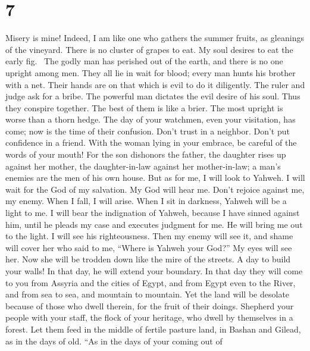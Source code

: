 \hypertarget{section-5}{%
\section{7}\label{section-5}}

 Misery is mine! Indeed, I am like one who gathers the
summer fruits, as gleanings of the vineyard. There is no cluster of
grapes to eat. My soul desires to eat the early fig.~ The
godly man has perished out of the earth, and there is no one upright
among men. They all lie in wait for blood; every man hunts his brother
with a net.  Their hands are on that which is evil to do
it diligently. The ruler and judge ask for a bribe. The powerful man
dictates the evil desire of his soul. Thus they conspire together.
 The best of them is like a brier. The most upright is
worse than a thorn hedge. The day of your watchmen, even your
visitation, has come; now is the time of their confusion. 
Don't trust in a neighbor. Don't put confidence in a friend. With the
woman lying in your embrace, be careful of the words of your mouth!
 For the son dishonors the father, the daughter rises up
against her mother, the daughter-in-law against her mother-in-law; a
man's enemies are the men of his own house.  But as for
me, I will look to Yahweh. I will wait for the God of my salvation. My
God will hear me.  Don't rejoice against me, my enemy.
When I fall, I will arise. When I sit in darkness, Yahweh will be a
light to me.  I will bear the indignation of Yahweh,
because I have sinned against him, until he pleads my case and executes
judgment for me. He will bring me out to the light. I will see his
righteousness.  Then my enemy will see it, and shame will
cover her who said to me, ``Where is Yahweh your God?'' My eyes will see
her. Now she will be trodden down like the mire of the streets.
 A day to build your walls! In that day, he will extend
your boundary.  In that day they will come to you from
Assyria and the cities of Egypt, and from Egypt even to the River, and
from sea to sea, and mountain to mountain.  Yet the land
will be desolate because of those who dwell therein, for the fruit of
their doings.  Shepherd your people with your staff, the
flock of your heritage, who dwell by themselves in a forest. Let them
feed in the middle of fertile pasture land, in Bashan and Gilead, as in
the days of old.  ``As in the days of your coming out of

